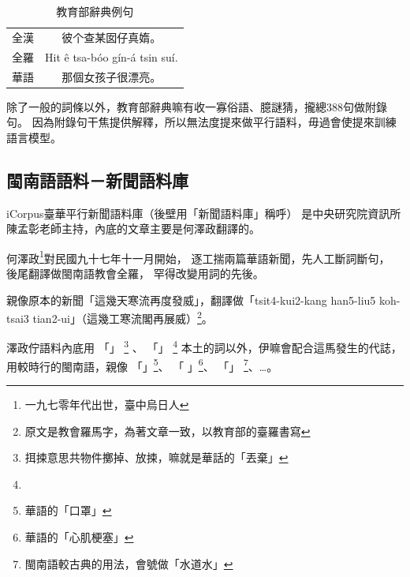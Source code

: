 \begin{table}
\caption{教育部辭典例句}
\label{表：教育部辭典例句}
\centering
\begin{tabular}{c|c}
全漢 & 彼个查某囡仔真媠。 \\
全羅 & Hit ê tsa-bóo gín-á tsin suí.\\
華語 & 那個女孩子很漂亮。\\
\end{tabular}
\end{table}

除了一般的詞條以外，教育部辭典嘛有收一寡俗語、臆謎猜，攏總388句做附錄句。
因為附錄句干焦提供解釋，所以無法度提來做平行語料，毋過會使提來訓練語言模型。


\subsection{閩南語語料－新聞語料庫}
\label{節：新聞語料庫}
iCorpus臺華平行新聞語料庫（後壁用「新聞語料庫」稱呼）\cite{iCorpus臺華平行新聞語料庫}
是中央研究院資訊所陳孟彰老師主持，內底的文章主要是何澤政翻譯的。

何澤政\footnote{一九七零年代出世，臺中烏日人}對民國九十七年十一月開始，
逐工揣兩篇華語新聞，先人工斷詞斷句，
後尾翻譯做閩南語教會全羅，
罕得改變用詞的先後。

親像原本的新聞「這幾天寒流再度發威」，翻譯做「tsit4-kui2-kang han5-liu5 koh-tsai3 tian2-ui」（這幾工寒流閣再展威）\footnote{原文是教會羅馬字，為著文章一致，以教育部的臺羅書寫}。

澤政佇語料內底用
「」
\footnote{挕捒意思共物件擲掉、放捒，嘛就是華話的「丟棄」
}
、
「」
\footnote{
}
本土的詞以外，伊嘛會配合這馬發生的代誌，用較時行的閩南語，親像
「」\footnote{華語的「口罩」}、
「
」\footnote{華語的「心肌梗塞」}、
「」
\footnote{閩南語較古典的用法，會號做「水道水」}、…。

